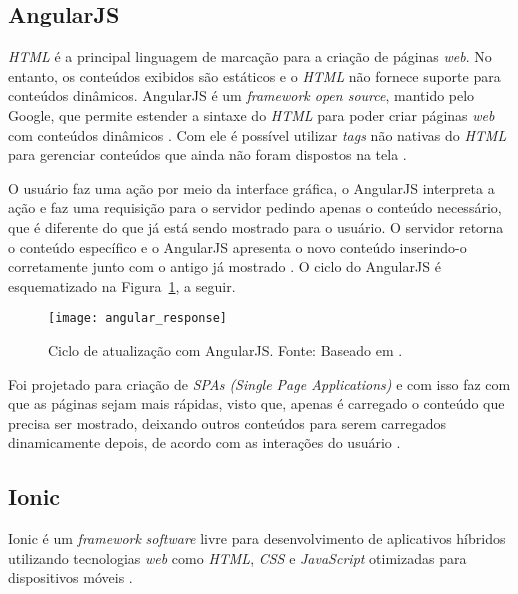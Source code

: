 \subsection{AngularJS} \label{subsection:angularjs}

\textit{HTML} é a principal linguagem de marcação para a criação de páginas \textit{web}. No entanto, os conteúdos 
exibidos são estáticos e o \textit{HTML} não fornece suporte para conteúdos dinâmicos.
AngularJS é um \textit{framework open source}, mantido pelo Google, que permite estender a sintaxe do 
\textit{HTML} para poder criar páginas \textit{web} com conteúdos dinâmicos \cite{bezerra_desenvolvimento_2016}. Com ele é possível utilizar \textit{tags} 
não nativas do \textit{HTML} para gerenciar conteúdos que ainda não 
foram dispostos na tela \cite{google_angularjs_2016}.

O usuário faz uma ação por meio da interface gráfica, 
o AngularJS interpreta a ação e faz uma requisição para o servidor pedindo apenas o conteúdo necessário, que é 
diferente do que já está sendo mostrado para o usuário. 
O servidor retorna o conteúdo específico e o AngularJS apresenta o novo conteúdo inserindo-o corretamente junto 
com o antigo já mostrado \cite{ursino_angularjs:_2015}. O ciclo do AngularJS é esquematizado na Figura~\ref{fig:angular_response}, a seguir.

\begin{figure}[h]
  \centering
    \texttt{[image: angular\_response]}
    \caption[Ciclo de atualização com AngularJS]{ Ciclo de atualização com AngularJS. Fonte: Baseado em \cite{ursino_angularjs:_2015}.}
	\label{fig:angular_response}
\end{figure}

Foi projetado para criação de \textit{SPAs (Single Page Applications)} e com isso faz com que as páginas sejam mais rápidas, visto que, apenas é carregado o conteúdo que precisa ser mostrado, 
deixando outros conteúdos para serem carregados dinamicamente depois, de acordo com as interações do usuário \cite{rodriguez_diseno_2015}.

\subsection{Ionic} \label{subsection:ionic}
Ionic é um \textit{framework} \textit{software} livre para desenvolvimento de aplicativos híbridos utilizando tecnologias 
\textit{web} como \textit{HTML}, \textit{CSS} e \textit{JavaScript} otimizadas para dispositivos móveis \cite{drifty_ionic:_2016}. 

